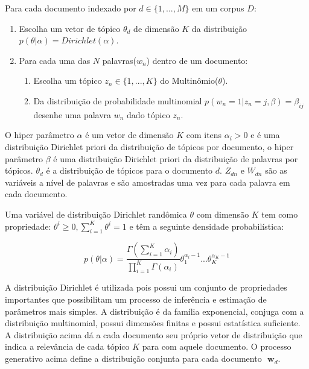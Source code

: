 \documentclass[12pt,a4paper]{article}
\begin{document}
  Para cada documento indexado por $d \in \{1,. . . , M\}$ em um corpus $D$:
  
  \begin{enumerate}
    \item Escolha um vetor de tópico $\theta _d$ de dimensão $K$ da distribuição $p(\theta|\alpha)=Dirichlet(\alpha)$.
    \item Para cada uma das $N$ palavras($w_n$) dentro de um documento:
    \begin{enumerate}
      \item Escolha um tópico \(z_n \in \{1,. . . , K\}\) do Multinômio($\theta$).
      \item Da distribuição de probabilidade multinomial \(p(w_n=1| z_n=j,\beta)=\beta _{ij}\)  desenhe uma palavra $w_n$ dado tópico $z_n$.
    \end{enumerate}
  \end{enumerate}
  
  O  hiper parâmetro $\alpha$ é um vetor de dimensão $K$ com itens \(\alpha _i>0\) e é uma distribuição Dirichlet priori da distribuição de tópicos por documento, o hiper parâmetro $\beta$ é uma distribuição Dirichlet priori da distribuição de palavras por tópicos. $\theta _d$ é a distribuição de tópicos para o documento $d$. $Z_{dn}$ e $W_{dn}$ são as variáveis a nível de palavras e são amostradas uma vez para cada palavra em cada documento.
  
  Uma variável de distribuição Dirichlet randômica $\theta$ com dimensão $K$ tem como propriedade: $\theta ^i \geq 0, \displaystyle\sum_{i=1}^{K} \theta ^i = 1$ e têm a seguinte densidade probabilística:
  
  \begin{equation}
  p(\theta|\alpha) = \frac{\Gamma(\displaystyle\sum_{i=1}^{K} \alpha _i)}{\displaystyle\prod_{i=1}^{K} \Gamma(\alpha _i)} \theta _1 ^{\alpha _i - 1} ...  \theta _K ^{\alpha _K - 1}
  \end{equation}
  
  A distribuição Dirichlet é utilizada pois possui um conjunto de propriedades importantes que possibilitam um processo de inferência e estimação de parâmetros mais simples. A distribuição é da família exponencial, conjuga com a distribuição multinomial, possui dimensões finitas e possui estatística suficiente. A distribuição  acima dá a cada documento seu próprio vetor de distribuição que indica a relevância de cada tópico $K$ para com aquele documento. O processo generativo acima define a distribuição conjunta para cada documento $\textbf{ w}_d$.
  
\end{document}
